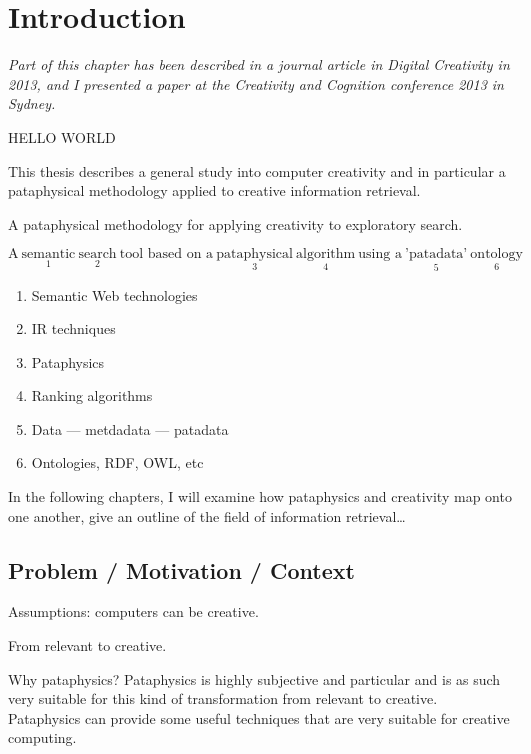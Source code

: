 
\chapter{Introduction}
\label{ch:intro}

\emph{Part of this chapter has been described in a journal article in Digital Creativity in 2013, and I presented a paper at the Creativity and Cognition conference 2013 in Sydney.} 

\grule %

{\color{red} HELLO WORLD}%

This thesis describes a general study into computer creativity and in particular a pataphysical methodology applied to creative information retrieval.

A pataphysical methodology for applying creativity to exploratory search.

{\small $\text{A} \ \underset{1}{\text{semantic}} \ \underset{2}{\text{search}} \ \text{tool based on a} \ \underset{3}{\text{pataphysical}} \ \underset{4}{\text{algorithm}} \ \text{using a} \ \underset{5}{\text{'patadata'}} \ \underset{6}{\text{ontology}}$
}

\begin{enumerate}
  \item Semantic Web technologies
  \item IR techniques
  \item Pataphysics
  \item Ranking algorithms
  \item Data --- metdadata --- patadata
  \item Ontologies, RDF, OWL, etc
\end{enumerate}


In the following chapters, I will examine how pataphysics and creativity map onto one another, give an outline of the field of information retrieval\ldots

\section{Problem / Motivation / Context}

Assumptions: computers can be creative.

From relevant to creative.

Why pataphysics?
Pataphysics is highly subjective and particular and is as such very suitable for this kind of transformation from relevant to creative.
Pataphysics can provide some useful techniques that are very suitable for creative computing.

